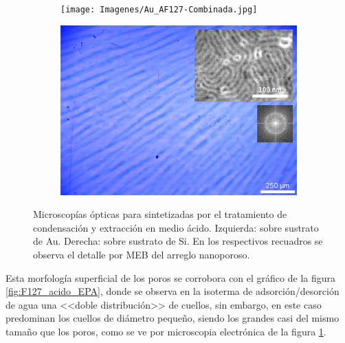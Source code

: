 {		\begin{figure}[!th]
	 	   	    \begin{subfigure}[t]{0.49\textwidth}
		       	\texttt{[image: Imagenes/Au\_AF127-Combinada.jpg]}
		   		\end{subfigure}
		   		\begin{subfigure}[t]{0.49\textwidth}
		   	    \includegraphics[width=\textwidth]{Imagenes/Si_AF127-Combinada.jpg}
		   		\end{subfigure}
				 \caption[Microscopía óptica \pdmF tratamiento en medio ácido.]{Microscopías ópticas para \pdmF\space sintetizadas por el tratamiento de condensación y extracción en medio ácido. Izquierda: sobre sustrato de Au. Derecha: sobre sustrato de Si. En los respectivos recuadros se observa el detalle por MEB del arreglo nanoporoso.}
				 \label{fig:Microscopia_F127_acido}	
			     \end{figure}	

		Esta morfología superficial de los poros se corrobora con el gráfico de la figura \ref{fig:F127_acido_EPA}, donde se observa en la isoterma de adsorción/desorción de agua una <<doble distribución>> de cuellos, sin embargo, en este caso predominan los cuellos de diámetro pequeño, siendo los grandes casi del mismo tamaño que los poros, como se ve por microscopia electrónica de la figura \ref{fig:Microscopia_F127_acido}.
		
}
